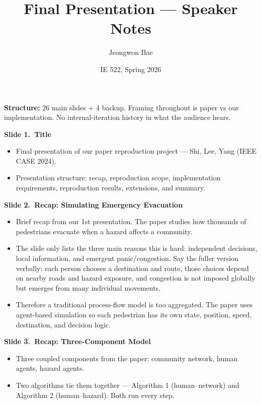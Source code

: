\documentclass[11pt]{article}
\title{Final Presentation --- Speaker Notes}
\author{Jeongwon Bae}
\date{IE 522, Spring 2026}
\newcommand{\slide}[2]{\vspace{0.6em}\noindent\textbf{Slide #1.\ #2}\par\nopagebreak\vspace{0.1em}}
\begin{document}
\maketitle

\noindent\textbf{Structure:} 26 main slides + 4 backup. Framing throughout is paper vs our implementation. No internal-iteration history in what the audience hears.

\slide{1}{Title}
\begin{itemize}
\item Final presentation of our paper reproduction project --- Shi, Lee, Yang (IEEE CASE 2024).
\item Presentation structure: recap, reproduction scope, implementation requirements, reproduction results, extensions, and summary.
\end{itemize}

\slide{2}{Recap: Simulating Emergency Evacuation}
\begin{itemize}
\item Brief recap from our 1st presentation. The paper studies how thousands of pedestrians evacuate when a hazard affects a community.
\item The slide only lists the three main reasons this is hard: independent decisions, local information, and emergent panic/congestion. Say the fuller version verbally: each person chooses a destination and route, those choices depend on nearby roads and hazard exposure, and congestion is not imposed globally but emerges from many individual movements.
\item Therefore a traditional process-flow model is too aggregated. The paper uses agent-based simulation so each pedestrian has its own state, position, speed, destination, and decision logic.
\end{itemize}

\slide{3}{Recap: Three-Component Model}
\begin{itemize}
\item Three coupled components from the paper: community network, human agents, hazard agents.
\item Two algorithms tie them together --- Algorithm 1 (human--network) and Algorithm 2 (human--hazard). Both run every step.
\end{itemize}
\end{document}
